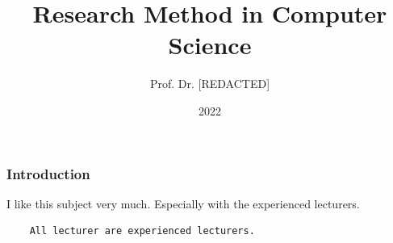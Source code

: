 \documentclass{beamer}
\title{Research Method in Computer Science}
\author{Prof. Dr. [REDACTED]}
\institute{Multimedia University}
\date{2022}
\begin{document}
\frame{\titlepage}
\begin{frame}
\frametitle{Introduction}
    I like this subject very much.
    Especially with the experienced lecturers.
\end{frame}

\begin{mdframed}[backgroundcolor=blue!20]
\begin{verbatim}
    All lecturer are experienced lecturers.
\end{verbatim}
\end{mdframed}
\end{document}
